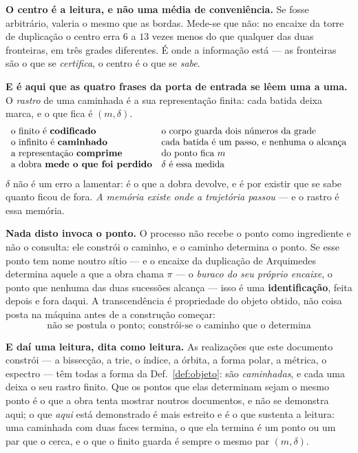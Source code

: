 \documentclass[11pt,a4paper]{article}
\begin{document}
\medskip\noindent\textbf{O centro é a leitura, e não uma média de conveniência.}
Se fosse arbitrário, valeria o mesmo que as bordas. Mede-se que não: no encaixe
da torre de duplicação o centro erra $6$ a $13$ vezes menos do que qualquer das
duas fronteiras, em três grades diferentes. É onde a informação está --- as
fronteiras são o que se \emph{certifica}, o centro é o que se \emph{sabe}.

\medskip\noindent\textbf{E é aqui que as quatro frases da porta de entrada se
lêem uma a uma.} O \emph{rastro} de uma caminhada é a sua representação finita:
cada batida deixa marca, e o que fica é $(m,\delta)$.
\[
\begin{array}{ll}
\text{o finito é \textbf{codificado}} & \text{o corpo guarda dois números da grade}\\
\text{o infinito é \textbf{caminhado}} & \text{cada batida é um passo, e nenhuma o alcança}\\
\text{a representação \textbf{comprime}} & \text{do ponto fica }m\\
\text{a dobra \textbf{mede o que foi perdido}} & \delta\ \text{é essa medida}
\end{array}
\]
$\delta$ não é um erro a lamentar: é o que a dobra devolve, e é por existir que
se sabe quanto ficou de fora. \emph{A memória existe onde a trajetória passou}
--- e o rastro é essa memória.

\medskip\noindent\textbf{Nada disto invoca o ponto.} O processo não recebe o
ponto como ingrediente e não o consulta: ele constrói o caminho, e o caminho
determina o ponto. Se esse ponto tem nome noutro sítio --- e o encaixe da
duplicação de Arquimedes determina aquele a que a obra chama $\pi$ --- o
\emph{buraco do seu próprio encaixe}, o ponto que nenhuma das duas sucessões
alcança --- isso é uma \textbf{identificação}, feita depois e fora daqui. A
transcendência é propriedade do objeto obtido, não coisa posta na máquina antes
de a construção começar:
\[
\boxed{\;\text{não se postula o ponto; constrói-se o caminho que o determina}\;}
\]

\medskip\noindent\textbf{E daí uma leitura, dita como leitura.} As realizações
que este documento constrói --- a bissecção, a trie, o índice, a órbita, a
forma polar, a métrica, o espectro --- têm todas a forma da
Def.~\ref{def:objeto}: são \emph{caminhadas}, e cada uma deixa o seu rastro
finito. Que os pontos que elas determinam sejam o mesmo ponto é o que a obra
tenta mostrar noutros documentos, e não se demonstra aqui; o que \emph{aqui}
está demonstrado é mais estreito e é o que sustenta a leitura: uma caminhada
com duas faces termina, o que ela termina é um ponto ou um par que o cerca, e o
que o finito guarda é sempre o mesmo par $(m,\delta)$.
\end{document}
